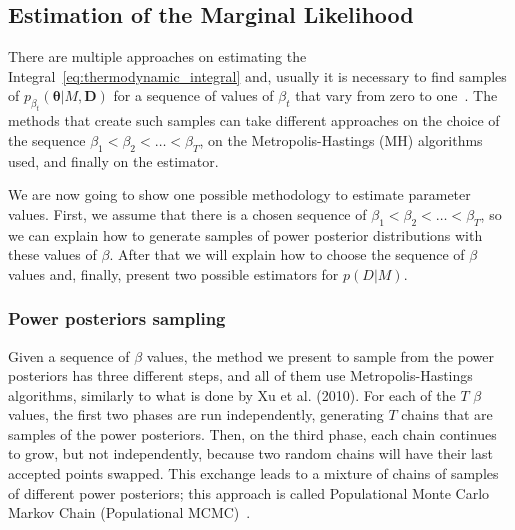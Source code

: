 \subsection{Estimation of the Marginal Likelihood}
There are multiple approaches on estimating the 
Integral~\ref{eq:thermodynamic_integral} and, usually it is necessary to 
find samples of $p_{\beta_t} ({\bm \theta} | M, {\bm D})$ for a sequence 
of values of $\beta_t$ that vary from zero to one~\cite{Xura20, 
Vyshemirsky2007, Friel2008}. The methods that create such samples can 
take different approaches on the choice of the sequence $\beta_1 < 
\beta_2 < \ldots < \beta_T$, on the Metropolis-Hastings (MH) algorithms 
used, and finally on the estimator.

We are now going to show one possible methodology to estimate parameter 
values. First, we assume that there is a chosen sequence of $\beta_1 <
\beta_2 < \ldots < \beta_T$, so we can explain how to generate samples 
of power posterior distributions with these values of $\beta$. After
that we will explain how to choose the sequence of $\beta$ values and,
finally, present two possible estimators for $p (D | M)$.

\subsubsection{Power posteriors sampling}
\label{sec:power_posteriors_sampling}
Given a sequence of $\beta$ values, the method we present to sample from 
the power posteriors has three different steps, and all of them use
Metropolis-Hastings algorithms, similarly to what is done by Xu et al. 
(2010). For each of the $T$ $\beta$ values, the first two phases are
run independently, generating $T$ chains that are samples of the power 
posteriors. Then, on the third phase, each chain continues to grow, but
not independently, because two random chains will have their last 
accepted points swapped. This exchange leads to a mixture of chains of
samples of different power posteriors; this approach is called 
Populational Monte Carlo Markov Chain (Populational 
MCMC)~\cite{Friel2008}.

